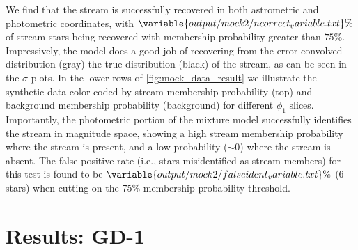 \documentclass[twocolumn, linenumbers]{aastex631}
\begin{document}
        We find that the stream is successfully recovered in both astrometric
        and photometric coordinates, with
        $\variable{output/mock2/ncorrect_variable.txt}\%$ 
        of stream stars being recovered with membership probability greater than
        $75\%$. Impressively, the model does a good job of recovering from the error convolved distribution (gray) the true distribution (black) of the stream, as can be seen in the $\sigma$ plots. In the lower rows of \autoref{fig:mock_data_result} we
        illustrate the synthetic data color-coded by stream membership
        probability (top) and background membership probability (background) for
        different $\phi_1$ slices. Importantly, the photometric portion of the
        mixture model successfully identifies the stream in magnitude space,
        showing a high stream membership probability where the stream is
        present, and a low probability ($\sim 0$) where the stream is absent.
        The false positive rate (i.e., stars misidentified as stream members)
        for this test is found to be $\variable{output/mock2/falseident_variable.txt}\%$ (6 stars) when cutting on the 75\%
        membership probability threshold.


\section{Results: GD-1} \label{sec:results_gd1}
\end{document}
